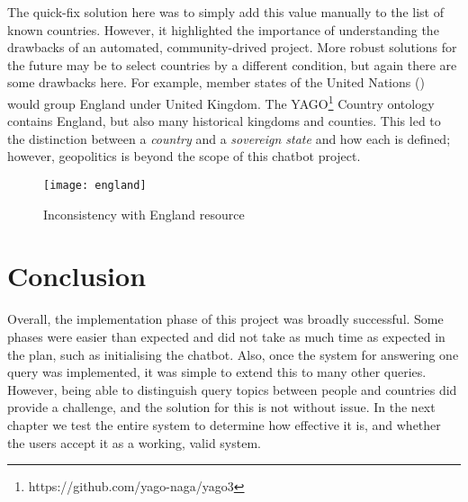 The quick-fix solution here was to simply add this value manually to the list of known countries. However, it highlighted the importance of understanding the drawbacks of an automated, community-drived project. More robust solutions for the future may be to select countries by a different condition, but again there are some drawbacks here. For example, member states of the United Nations () would group England under United Kingdom. The YAGO\footnote{https://github.com/yago-naga/yago3} Country ontology contains England, but also many historical kingdoms and counties. This led to the distinction between a {\it country} and a {\it sovereign state} and how each is defined\cite{fowler1996}; however, geopolitics is beyond the scope of this chatbot project.

\begin{figure}[p]
	\centering
	\texttt{[image: england]}
	\caption{Inconsistency with England resource}
	\label{fig:england}
\end{figure}

\section{Conclusion}
Overall, the implementation phase of this project was broadly successful. Some phases were easier than expected and did not take as much time as expected in the plan, such as initialising the chatbot. Also, once the system for answering one query was implemented, it was simple to extend this to many other queries. However, being able to distinguish query topics between people and countries did provide a challenge, and the solution for this is not without issue. In the next chapter we test the entire system to determine how effective it is, and whether the users accept it as a working, valid system.

